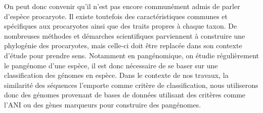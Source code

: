 On peut donc convenir qu'il n'est pas encore communément admis de parler d'espèce procaryote. Il existe toutefois des caractéristiques communes et spécifiques aux procaryotes ainsi que des traits propres à chaque taxon. De nombreuses méthodes et démarches scientifiques parviennent à construire une phylogénie des procaryotes, mais celle-ci doit être replacée dans son contexte d'étude pour prendre sens. Notamment en pangénomique, on étudie régulièrement le pangénome d'une espèce, il est donc nécessaire de se baser sur une classification des génomes en espèce. Dans le contexte de nos travaux, la similarité des séquences l'emporte comme critère de classification, nous utiliserons donc des génomes provenant de bases de données utilisant des critères comme l'ANI ou des gènes marqueurs pour construire des pangénomes.

